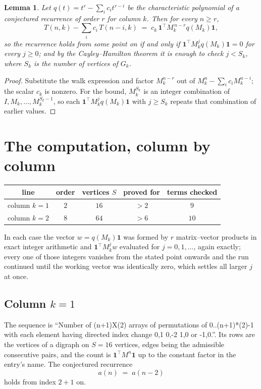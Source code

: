 \documentclass[11pt,a4paper]{article}
\theoremstyle{plain}
\newtheorem{lemma}[theorem]{Lemma}
\theoremstyle{definition}
\begin{document}
\begin{lemma}\label{lem:crit}
Let $q(t)=t^{r}-\sum_i c_it^{r-i}$ be the characteristic polynomial of a conjectured
recurrence of order $r$ for column $k$. Then for every $n\ge r$,
\[
T(n,k)-\sum_i c_i\,T(n-i,k)\;=\;c_k\,\mathbf{1}^{\!\top}M_k^{\,n-r}q(M_k)\mathbf{1},
\]
so the recurrence holds from some point on if and only if
$\mathbf{1}^{\!\top}M_k^{j}q(M_k)\mathbf{1}=0$ for every $j\ge0$; and by the
Cayley--Hamilton theorem it is enough to check $j<S_k$, where $S_k$ is the number of vertices
of $G_k$.
\end{lemma}

\begin{proof}
Substitute the walk expression and factor $M_k^{n-r}$ out of $M_k^{n}-\sum_ic_iM_k^{n-i}$;
the scalar $c_k$ is nonzero. For the bound, $M_k^{S_k}$ is an integer combination of
$I,M_k,\dots,M_k^{S_k-1}$, so each $\mathbf{1}^{\!\top}M_k^{j}q(M_k)\mathbf{1}$ with
$j\ge S_k$ repeats that combination of earlier values.
\end{proof}

\section{The computation, column by column}

\begin{center}
\begin{tabular}{ccccc}
line & order & vertices $S$ & proved for & terms checked \\ \hline
column $k$$=1$ & $2$ & $16$ & $>2$ & $9$ \\
column $k$$=2$ & $8$ & $64$ & $>6$ & $10$ \\
\end{tabular}
\end{center}

In each case the vector $w=q(M_k)\mathbf{1}$ was formed by $r$ matrix--vector products in
exact integer arithmetic and $\mathbf{1}^{\!\top}M_k^{j}w$ evaluated for $j=0,1,\dots$,
again exactly; every one of those integers vanishes from the stated point onwards and the run
continued until the working vector was identically zero, which settles all larger $j$ at once.

\subsection*{Column $k$$=1$}
The sequence is ``Number of (n+1)X(2) arrays of permutations of 0..(n+1)*(2)-1 with each element having directed index change 0,1 0,-2 1,0 or -1,0.''. Its rows are the vertices of a digraph on
$S=16$ vertices, edges being the admissible consecutive pairs, and the count is
$\mathbf{1}^{\!\top}M^{n}\mathbf{1}$ up to the constant factor in the entry's name.
The conjectured recurrence
\[
a(n)\;=\;a(n-2)
\]
holds from index $2+1$ on.
\end{document}
